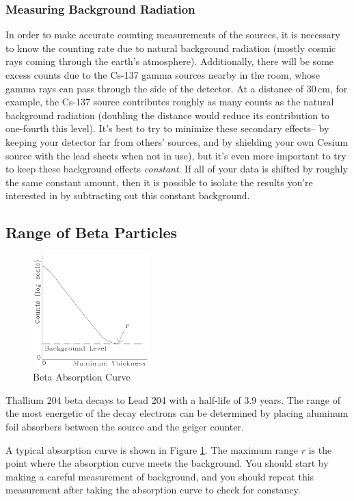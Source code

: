 \subsubsection{Measuring Background Radiation}

In order to make accurate counting measurements of the sources, it is necessary to know the counting rate due to natural background radiation (mostly cosmic rays coming through the earth's atmosphere). Additionally, there will be some excess counts due to the Cs-137 gamma sources nearby in the room, whose gamma rays can pass through the side of the detector. At a distance of $30\,\mathrm{cm}$, for example, the Cs-137 source contributes roughly as many counts as the natural background radiation (doubling the distance would reduce its contribution to one-fourth this level). It's best to try to minimize these secondary effects-- by keeping your detector far from others' sources, and by shielding your own Cesium source with the lead sheets when not in use), but it's even more important to try to keep these background effects \emph{constant}. If all of your data is shifted by roughly the same constant amount, then it is possible to isolate the results you're interested in by subtracting out this constant background.

\subsection{Range of Beta Particles}
\begin{figure}[h]
\centering
\includegraphics[width=0.4\textwidth]{./Exp10/pic/image7.png}
\caption{Beta Absorption Curve}
\label{fig:beta}
\end{figure}
Thallium 204 beta decays to Lead 204 with a half-life of 3.9 years. The range of the most energetic of the decay electrons can be determined by placing aluminum foil absorbers between the source and the geiger counter.\myskip

A typical absorption curve is shown in Figure {\ref{fig:beta}}. The maximum range $r$ is the point where the absorption curve meets the background. You should start by making a careful measurement of background, and you should repeat this measurement after taking the absorption curve to check for constancy.\myskip

